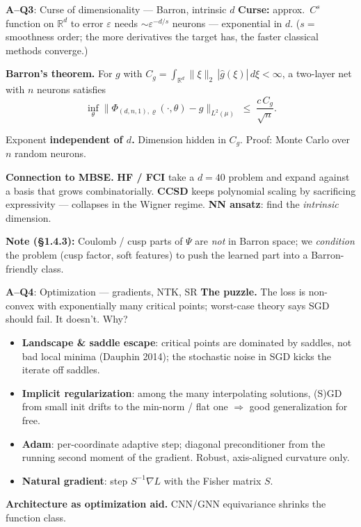 \documentclass[10pt,aspectratio=169]{beamer}
\newcommand{\paperA}[1]{\textcolor{papA}{\textbf{#1}}}
\newcommand{\ours}[1]{\textcolor{ourwork}{\textbf{#1}}}
\begin{document}
\begin{frame}{\paperA{A--Q3}: Curse of dimensionality --- Barron, intrinsic $d$}
\small
\textbf{Curse:} approx.\ $C^s$ function on $\mathbb R^d$ to error $\varepsilon$ needs
$\sim \varepsilon^{-d/s}$ neurons --- exponential in $d$. ($s=$ smoothness order; the more
derivatives the target has, the faster classical methods converge.)

\vspace{4pt}
\textbf{Barron's theorem.} For $g$ with
$C_g=\!\int_{\mathbb R^d}\!\|\xi\|_2\,|\hat g(\xi)|\,d\xi<\infty$, a two-layer net with $n$ neurons satisfies
\[
  \inf_\theta\|\Phi_{(d,n,1),\varrho}(\cdot,\theta)-g\|_{L^2(\mu)}
   \;\le\; \frac{c\,C_g}{\sqrt n}.
\]
\centering\colorbox{papA!10}{\parbox{0.72\linewidth}{\centering\small Exponent \textbf{independent of $d$.}
Dimension hidden in $C_g$. Proof: Monte Carlo over $n$ random neurons.}}

\vspace{4pt}
\raggedright
\textbf{Connection to MBSE.} \paperA{HF / FCI} take a $d{=}40$ problem and expand against a basis
that grows combinatorially. \paperA{CCSD} keeps polynomial scaling by sacrificing expressivity ---
collapses in the Wigner regime. \ours{NN ansatz}: find the \emph{intrinsic} dimension.

\vspace{2pt}
\paperA{Note (\S1.4.3):} Coulomb / cusp parts of $\Psi$ are \emph{not} in Barron space; we
\emph{condition} the problem (cusp factor, soft features) to push the learned part into a
Barron-friendly class.
\end{frame}

\begin{frame}{\paperA{A--Q4}: Optimization --- gradients, NTK, SR}
\small
\textbf{The puzzle.} The loss is non-convex with exponentially many critical points; worst-case
theory says SGD should fail. It doesn't. Why?

\vspace{4pt}
\begin{itemize}\setlength\itemsep{2pt}\small
\item \paperA{Landscape \& saddle escape}: critical points are dominated by saddles, not bad local
minima (Dauphin 2014); the stochastic noise in SGD kicks the iterate off saddles.
\item \paperA{Implicit regularization}: among the many interpolating solutions, (S)GD from small init
drifts to the min-norm / flat one $\Rightarrow$ good generalization for free.
\item \paperA{Adam}: per-coordinate adaptive step; diagonal preconditioner from the running second
moment of the gradient. Robust, axis-aligned curvature only.
\item \paperA{Natural gradient}: step $S^{-1}\nabla L$ with the Fisher matrix $S$.
\end{itemize}

\vspace{4pt}
\textbf{Architecture as optimization aid.}  CNN/GNN equivariance shrinks
the function class.
\end{frame}
\end{document}
